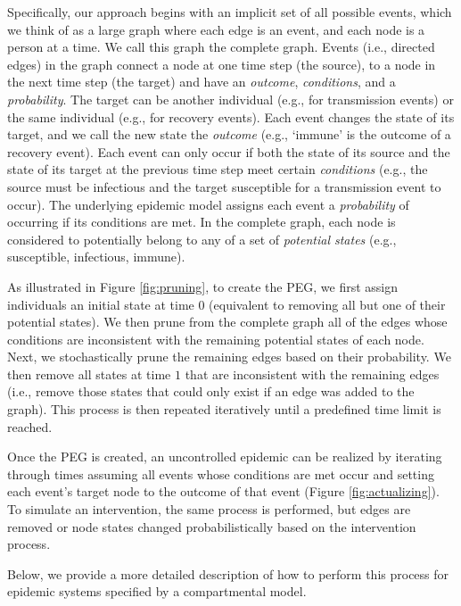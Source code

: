 \documentclass[PTRSB]{rsos}
\begin{document}
\begin{multicols}{2}
Specifically, our approach begins with an implicit set of all possible events, which we think of as a large graph where each edge is an event, and each node is a person at a time.
We call this graph the complete graph.
Events (i.e., directed edges) in the graph connect a node at one time step (the source), to a node in the next time step (the target) and have an \emph{outcome}, \emph{conditions}, and a \emph{probability}.
The target can be another individual (e.g., for transmission events) or the same individual (e.g., for recovery events).
Each event changes the state of its target, and we call the new state the \emph{outcome} (e.g., `immune' is the outcome of a recovery event).
Each event can only occur if both the state of its source and the state of its target at the previous time step meet certain \emph{conditions} (e.g., the source must be infectious and the target susceptible for a transmission event to occur).
The underlying epidemic model assigns each event a \emph{probability} of occurring if its conditions are met.
In the complete graph, each node is considered to potentially belong to any of a set of \emph{potential states} (e.g., susceptible, infectious, immune).

As illustrated in Figure \ref{fig:pruning}, to create the PEG, we first assign individuals an initial state at time $0$ (equivalent to removing all but one of their potential states).
We then prune from the complete graph all of the edges whose conditions are inconsistent with the remaining potential states of each node.
Next, we stochastically prune the remaining edges based on their probability.
We then remove all states at time $1$ that are inconsistent with the remaining edges (i.e., remove those states that could only exist if an edge was added to the graph).
This process is then repeated iteratively until a predefined time limit is reached.

Once the PEG is created, an uncontrolled epidemic can be realized by iterating through times assuming all events whose conditions are met occur and setting each event's target node to the outcome of that event (Figure \ref{fig:actualizing}).
To simulate an intervention, the same process is performed, but edges are removed or node states changed probabilistically based on the intervention process.

Below, we provide a more detailed description of how to perform this process for epidemic systems specified by a compartmental model.


\end{multicols}
\end{document}
